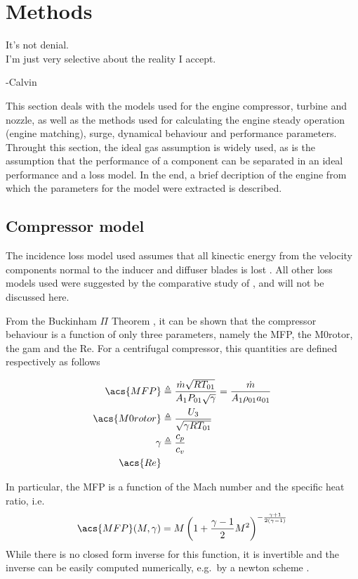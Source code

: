 \documentclass[tcc]{subfiles}
\begin{document}
\chapter{Methods}
\label{sec:methods}
\epigraph{It's not denial. \\ I'm just very selective about the reality I accept.}{-Calvin}

This section deals with the models used for the engine compressor, turbine and nozzle, 
as well as the methods used for calculating the engine steady operation (engine matching), 
surge, dynamical behaviour and performance parameters. 
Throught this section, the ideal gas assumption is widely used, 
as is the assumption that the performance of a component can be separated in an ideal performance and a loss model. In the end, a brief decription of the engine from which the parameters for the model were extracted is described.

\section{Compressor model}

The incidence loss model used assumes that all kinectic energy from the velocity components
normal to the inducer and diffuser blades is lost \cite{Stanitz1953}.
All other loss models used were suggested by the comparative study of \textcite{Oh1997}, 
and will not be discussed here.



From the Buckinham $\Pi$ Theorem \cite{Buckingham1914}, 
it can be shown that the compressor behaviour is a function of only three parameters, 
namely the \acl{MFP}, the \acl{M0rotor}, the \acl{gam} and the \acl{Re}. 
For a centrifugal compressor, this quantities are defined respectively as follows

\begin{align}
    \acs{MFP} &\triangleq \MFP{1} = \MFPalt{1} \\
    \acs{M0rotor} &\triangleq \frac{U_3}{\sqrt{\gamma R T_{01}}} \\
    \gamma &\triangleq \frac{c_p}{c_v} \\
    \acs{Re} &
\end{align}

In particular, the \acl{MFP} is a function of the Mach number and the specific heat ratio,
 i.e.\
\begin{equation}
    \label{eqn:mfp2mach}
    \acs{MFP}(M,\gamma) = M \left( 1 + \frac{\gamma-1}{2}M^2\right)^{-\frac{\gamma+1}{2(\gamma-1)}}
\end{equation}
While there is no closed form inverse for this function, it is invertible and the inverse can be easily computed numerically, e.g.\ by a newton scheme \cite{Der1974}.
\end{document}
